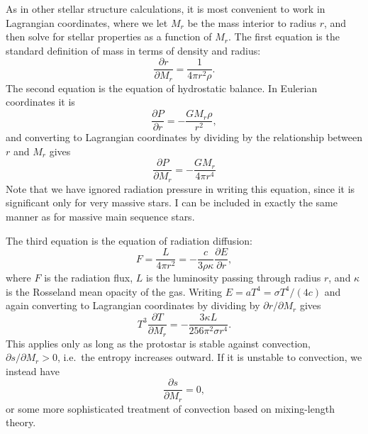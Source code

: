 As in other stellar structure calculations, it is most convenient to work in Lagrangian coordinates, where we let $M_r$ be the mass interior to radius $r$, and then solve for stellar properties as a function of $M_r$. The first equation is the standard definition of mass in terms of density and radius:
\begin{equation}
\label{mass}
\frac{\partial r}{\partial M_r} = \frac{1}{4\pi r^2 \rho}.
\end{equation}
The second equation is the equation of hydrostatic balance. In Eulerian coordinates it is
\begin{equation}
\frac{\partial P}{\partial r} = -\frac{G M_r \rho}{r^2},
\end{equation}
and converting to Lagrangian coordinates by dividing by the relationship between $r$ and $M_r$ gives
\begin{equation}
\frac{\partial P}{\partial M_r} = -\frac{G M_r}{4\pi r^4}
\end{equation}
Note that we have ignored radiation pressure in writing this equation, since it is significant only for very massive stars. I can be included in exactly the same manner as for massive main sequence stars.

The third equation is the equation of radiation diffusion:
\begin{equation}
F = \frac{L}{4\pi r^2} = -\frac{c}{3\rho\kappa} \frac{\partial E}{\partial r},
\end{equation}
where $F$ is the radiation flux, $L$ is the luminosity passing through radius $r$, and $\kappa$ is the Rosseland mean opacity of the gas. Writing $E=aT^4 = \sigma T^4/(4c)$ and again converting to Lagrangian coordinates by dividing by $\partial r/\partial M_r$ gives
\begin{equation}
T^3 \frac{\partial T}{\partial M_r} = - \frac{3\kappa L}{256 \pi^2 \sigma r^4}.
\end{equation}
This applies only as long as the protostar is stable against convection, $\partial s/\partial M_r > 0$, i.e.\ the entropy increases outward. If it is unstable to convection, we instead have
\begin{equation}
\frac{\partial s}{\partial M_r} = 0,
\end{equation}
or some more sophisticated treatment of convection based on mixing-length theory.

